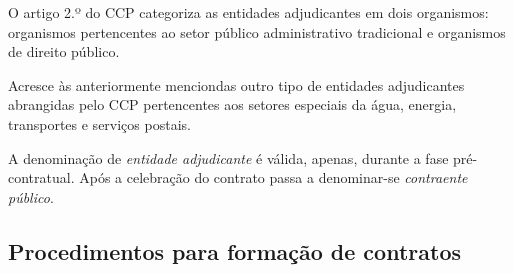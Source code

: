 O artigo 2.º do CCP categoriza as entidades adjudicantes em dois organismos: organismos pertencentes ao setor público administrativo tradicional e organismos de direito público.


\begin{table}[h!]
	
	\centering
	\setlength{\tabcolsep}{15pt}
	\setlength\cellspacetoplimit{0.5cm} 
	\setlength\cellspacebottomlimit{0.5cm} 
	\renewcommand{\arraystretch}{1.5}

	
	\caption{Categorização das Entidades Adjudicantes.}
	\label{table:1}
\end{table}



Acresce às anteriormente menciondas outro tipo de entidades adjudicantes abrangidas pelo CCP pertencentes aos setores especiais da água, energia, transportes e serviços postais. 

A denominação  de \textit{entidade adjudicante} é válida, apenas, durante a fase pré-contratual. Após a celebração do contrato passa a denominar-se \textit{contraente público}. 



\subsection{Procedimentos para formação de contratos}

